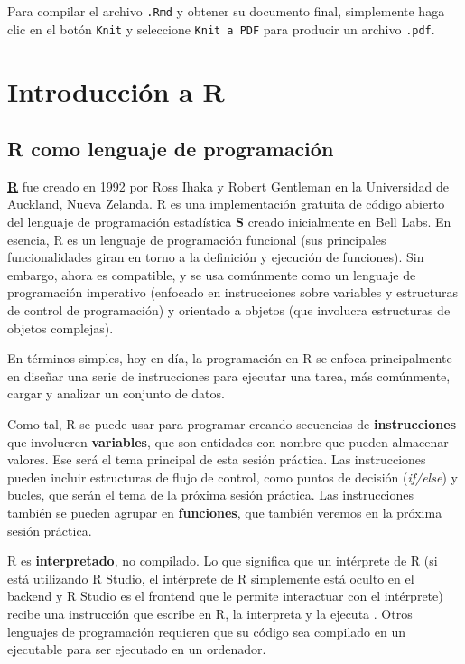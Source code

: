 \documentclass[
]{book}
\begin{document}
Para compilar el archivo \texttt{.Rmd} y obtener su documento final, simplemente haga clic en el botón \texttt{Knit} y seleccione \texttt{Knit\ a\ PDF} para producir un archivo \texttt{.pdf}.

\hypertarget{intro}{%
\chapter{Introducción a R}\label{intro}}

\hypertarget{r-como-lenguaje-de-programaciuxf3n}{%
\section{R como lenguaje de programación}\label{r-como-lenguaje-de-programaciuxf3n}}

\textbf{\href{https://www.r-project.org/}{R}} fue creado en 1992 por Ross Ihaka y Robert Gentleman en la Universidad de Auckland, Nueva Zelanda. R es una implementación gratuita de código abierto del lenguaje de programación estadística \textbf{S} creado inicialmente en Bell Labs. En esencia, R es un lenguaje de programación funcional (sus principales funcionalidades giran en torno a la definición y ejecución de funciones). Sin embargo, ahora es compatible, y se usa comúnmente como un lenguaje de programación imperativo (enfocado en instrucciones sobre variables y estructuras de control de programación) y orientado a objetos (que involucra estructuras de objetos complejas).

En términos simples, hoy en día, la programación en R se enfoca principalmente en diseñar una serie de instrucciones para ejecutar una tarea, más comúnmente, cargar y analizar un conjunto de datos.

Como tal, R se puede usar para programar creando secuencias de \textbf{instrucciones} que involucren \textbf{variables}, que son entidades con nombre que pueden almacenar valores. Ese será el tema principal de esta sesión práctica. Las instrucciones pueden incluir estructuras de flujo de control, como puntos de decisión (\emph{if/else}) y bucles, que serán el tema de la próxima sesión práctica. Las instrucciones también se pueden agrupar en \textbf{funciones}, que también veremos en la próxima sesión práctica.

R es \textbf{interpretado}, no compilado. Lo que significa que un intérprete de R (si está utilizando R Studio, el intérprete de R simplemente está oculto en el backend y R Studio es el frontend que le permite interactuar con el intérprete) recibe una instrucción que escribe en R, la interpreta y la ejecuta . Otros lenguajes de programación requieren que su código sea compilado en un ejecutable para ser ejecutado en un ordenador.
\end{document}
